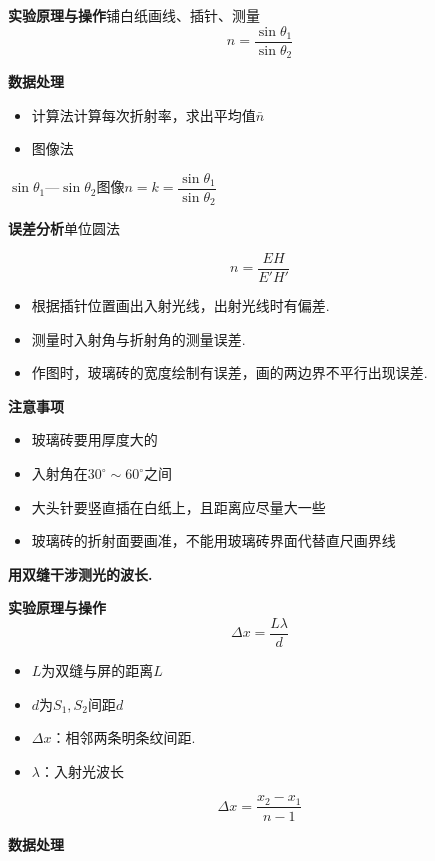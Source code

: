 \textbf{实验原理与操作}\quad 铺白纸画线、插针、测量
\[ n=\frac{\sin\theta_1}{\sin\theta_2} \]

\textbf{数据处理}
\begin{itemize}
\item 计算法\quad 计算每次折射率，求出平均值$\bar{n}$
\item 图像法
\end{itemize}


$\sin\theta_1$—$\sin\theta_2$图像\qquad $n=k=\dfrac{\sin\theta_1}{\sin\theta_2}$

\textbf{误差分析}\quad 单位圆法


\[ n=\frac{EH}{E'H'} \]

\begin{itemize}
\item[\unclear{①}] 根据插针位置画出入射光线，出射光线时有偏差. %
\item[②] 测量时入射角与折射角的测量误差.
\item[③] 作图时，玻璃砖的宽度绘制有误差，画的两边界不平行出现误差.
\end{itemize}

\textbf{注意事项}
\begin{itemize}
\item 玻璃砖要用厚度大的
\item 入射角在$30^\circ\sim60^\circ$之间
\item 大头针要竖直插在白纸上，且距离应尽量大一些
\item 玻璃砖的折射面要画准，不能用玻璃砖界面代替直尺画界线
\end{itemize}
\textbf{用双缝干涉测光的波长.}

\textbf{实验原理与操作}
\[ \Delta x=\frac{L\lambda}{d} \]
\begin{itemize}
\item $L$为双缝与屏的距离$L$
\item $d$为$S_1,S_2$间距$d$
\item $\Delta x$：相邻两条明条纹间距.
\item $\lambda$：入射光波长
\end{itemize}
\[ \Delta x=\frac{x_2-x_1}{n-1} \]

\textbf{数据处理}

